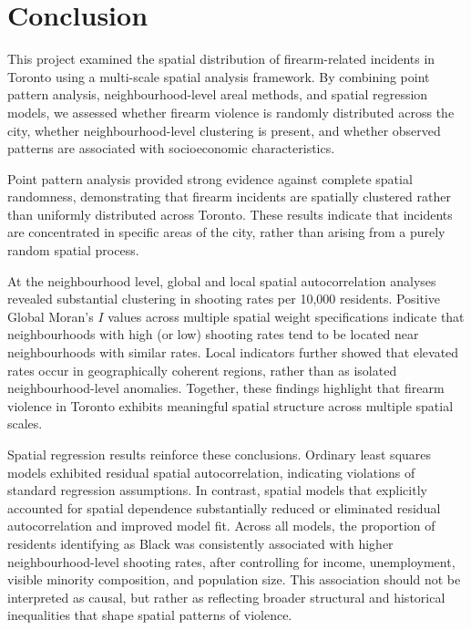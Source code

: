 \documentclass{article}
\begin{document}
\section{Conclusion}

\noindent This project examined the spatial distribution of firearm-related incidents in Toronto using a multi-scale spatial analysis framework. By combining point pattern analysis, neighbourhood-level areal methods, and spatial regression models, we assessed whether firearm violence is randomly distributed across the city, whether neighbourhood-level clustering is present, and whether observed patterns are associated with socioeconomic characteristics.

\noindent Point pattern analysis provided strong evidence against complete spatial randomness, demonstrating that firearm incidents are spatially clustered rather than uniformly distributed across Toronto. These results indicate that incidents are concentrated in specific areas of the city, rather than arising from a purely random spatial process.

\noindent At the neighbourhood level, global and local spatial autocorrelation analyses revealed substantial clustering in shooting rates per 10{,}000 residents. Positive Global Moran’s $I$ values across multiple spatial weight specifications indicate that neighbourhoods with high (or low) shooting rates tend to be located near neighbourhoods with similar rates. Local indicators further showed that elevated rates occur in geographically coherent regions, rather than as isolated neighbourhood-level anomalies. Together, these findings highlight that firearm violence in Toronto exhibits meaningful spatial structure across multiple spatial scales.

\noindent Spatial regression results reinforce these conclusions. Ordinary least squares models exhibited residual spatial autocorrelation, indicating violations of standard regression assumptions. In contrast, spatial models that explicitly accounted for spatial dependence substantially reduced or eliminated residual autocorrelation and improved model fit. Across all models, the proportion of residents identifying as Black was consistently associated with higher neighbourhood-level shooting rates, after controlling for income, unemployment, visible minority composition, and population size. This association should not be interpreted as causal, but rather as reflecting broader structural and historical inequalities that shape spatial patterns of violence.
\end{document}
